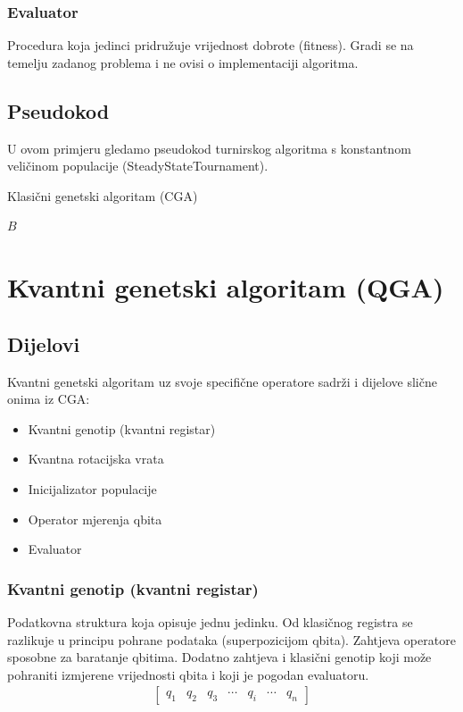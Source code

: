 \documentclass[times, utf8, zavrsni]{fer}
\begin{document}
\subsubsection{Evaluator}
Procedura koja jedinci pridružuje vrijednost dobrote (fitness). Gradi se na temelju zadanog problema i ne ovisi o implementaciji algoritma.


\subsection{Pseudokod}
U ovom primjeru gledamo pseudokod turnirskog algoritma s konstantnom veličinom populacije (SteadyStateTournament).
\begin{algorithm}
\caption{Klasični genetski algoritam (CGA)}
\label{algo:cga}
\begin{algorithmic}
\ENDWHILE
\RETURN $B$
\end{algorithmic}
\end{algorithm}

\section{Kvantni genetski algoritam (QGA)}
\subsection{Dijelovi}
Kvantni genetski algoritam uz svoje specifične operatore sadrži i dijelove slične onima iz CGA:
\begin{itemize}
\item Kvantni genotip (kvantni registar)
\item Kvantna rotacijska vrata
\item Inicijalizator populacije
\item Operator mjerenja qbita
\item Evaluator
\end{itemize}

\subsubsection{Kvantni genotip (kvantni registar)}
Podatkovna struktura koja opisuje jednu jedinku. Od klasičnog registra se razlikuje u principu pohrane podataka (superpozicijom qbita). Zahtjeva operatore sposobne za baratanje qbitima. Dodatno zahtjeva i klasični genotip koji može pohraniti izmjerene vrijednosti qbita i koji je pogodan evaluatoru.
\begin{align*}
\begin{bmatrix}
q_1 & q_2 & q_3 & \cdots & q_i & \cdots & q_n
\end{bmatrix}
\end{align*}
\end{document}
